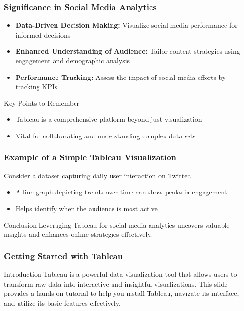 \documentclass{beamer}
\begin{document}
\begin{frame}[fragile]
    \frametitle{Significance in Social Media Analytics}
    \begin{itemize}
        \item \textbf{Data-Driven Decision Making:} Visualize social media performance for informed decisions
        \item \textbf{Enhanced Understanding of Audience:} Tailor content strategies using engagement and demographic analysis
        \item \textbf{Performance Tracking:} Assess the impact of social media efforts by tracking KPIs
    \end{itemize}

    \begin{block}{Key Points to Remember}
        \begin{itemize}
            \item Tableau is a comprehensive platform beyond just visualization
            \item Vital for collaborating and understanding complex data sets
        \end{itemize}
    \end{block}
\end{frame}

\begin{frame}[fragile]
    \frametitle{Example of a Simple Tableau Visualization}
    Consider a dataset capturing daily user interaction on Twitter. 
    \begin{itemize}
        \item A line graph depicting trends over time can show peaks in engagement
        \item Helps identify when the audience is most active
    \end{itemize}

    \begin{block}{Conclusion}
        Leveraging Tableau for social media analytics uncovers valuable insights and enhances online strategies effectively.
    \end{block}
\end{frame}

\begin{frame}[fragile]
    \frametitle{Getting Started with Tableau}
    \begin{block}{Introduction}
        Tableau is a powerful data visualization tool that allows users to transform raw data into interactive and insightful visualizations. This slide provides a hands-on tutorial to help you install Tableau, navigate its interface, and utilize its basic features effectively.
    \end{block}
\end{frame}
\end{document}
